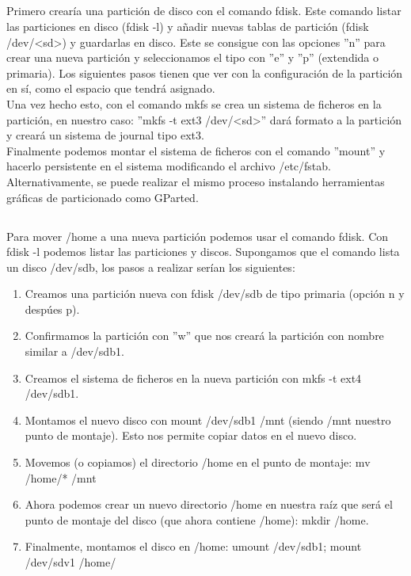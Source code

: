 \documentclass[10pt,a4paper]{article}
\begin{document}
\subsection{}
Primero crearía una partición de disco con el comando fdisk. Este comando listar las particiones en disco (fdisk -l) y añadir nuevas tablas de partición (fdisk /dev/\textless sd\textgreater) y guardarlas en disco. Este se consigue con las opciones ''n'' para crear una nueva partición y seleccionamos el tipo con ''e'' y ''p'' (extendida o primaria). Los siguientes pasos tienen que ver con la configuración de la partición en sí, como el espacio que tendrá asignado.\\
Una vez hecho esto, con el comando mkfs se crea un sistema de ficheros en la partición, en nuestro caso: ''mkfs -t ext3 /dev/\textless sd\textgreater''  dará formato a la partición y creará un sistema de journal tipo ext3.\\
Finalmente podemos montar el sistema de ficheros con el comando ''mount'' y hacerlo persistente en el sistema modificando el archivo /etc/fstab.\\
Alternativamente, se puede realizar el mismo proceso instalando herramientas gráficas de particionado como GParted.
\subsection{}
Para mover /home a una nueva partición podemos usar el comando fdisk. Con fdisk -l podemos listar las particiones y discos. Supongamos que el comando lista un disco /dev/sdb, los pasos a realizar serían los siguientes:
\begin{enumerate}
\item Creamos una partición nueva con fdisk /dev/sdb de tipo primaria (opción n y despúes p).
\item Confirmamos la partición con ''w'' que nos creará la partición con nombre similar a /dev/sdb1.
\item Creamos el sistema de ficheros en la nueva partición con mkfs -t ext4 /dev/sdb1.
\item Montamos el nuevo disco con mount /dev/sdb1 /mnt (siendo /mnt nuestro punto de montaje). Esto nos permite copiar datos en el nuevo disco.
\item Movemos (o copiamos) el directorio /home en el punto de montaje: mv /home/* /mnt
\item Ahora podemos crear un nuevo directorio /home en nuestra raíz que será el punto de montaje del disco (que ahora contiene /home): mkdir /home.
\item Finalmente, montamos el disco en /home: umount /dev/sdb1; mount /dev/sdv1 /home/
\end{enumerate}
\end{document}
